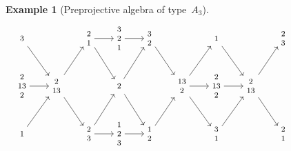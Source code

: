 \documentclass{amsart}
\theoremstyle{definition}
\newtheorem{example}[theorem]{Example}
\begin{document}
\begin{example}[Preprojective algebra of type~$A_3$]
\[
\hspace*{-2cm}
{\footnotesize
\begin{tikzcd}
    \begin{matrix} 3 \end{matrix}\arrow[dr] && \begin{matrix} 2 \\ 1 \end{matrix}\arrow[r]\arrow[dr] & \begin{matrix} 3 \\ 2 \\ 1 \end{matrix}\arrow[r]& \begin{matrix} 3 \\ 2 \end{matrix}\arrow[dr] && \begin{matrix} 1 \end{matrix}\arrow[dr]&& \begin{matrix} 2 \\ 3 \end{matrix} \\
    \begin{matrix} 2 \\ 13 \\ 2 \end{matrix}\ar[r] & \begin{matrix} 2\\ 13 \end{matrix}\arrow[ur]\arrow[dr] && \begin{matrix} 2 \end{matrix}\arrow[ur]\arrow[dr] && \begin{matrix} 13\\2 \end{matrix}\arrow[ur]\arrow[dr]\arrow[r] & \begin{matrix} 2\\13\\2 \end{matrix}\arrow[r] & \begin{matrix} 2\\13 \end{matrix}\arrow[ur]\arrow[dr] &  \\
    \begin{matrix} 1 \end{matrix}\arrow[ur] && \begin{matrix} 2\\3 \end{matrix}\arrow[ur]\arrow[r] & \begin{matrix} 1\\2\\3 \end{matrix}\arrow[r] & \begin{matrix} 1\\2 \end{matrix}\arrow[ur] && \begin{matrix} 3\\1 \end{matrix}\arrow[ur] && \begin{matrix} 2\\1 \end{matrix}

\end{tikzcd}}\]
\end{example}
\end{document}
